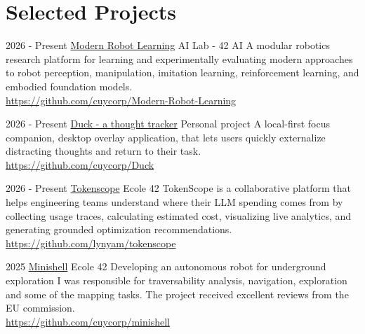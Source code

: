 \documentclass[]{friggeri-cv}
\begin{document}

\section{Selected Projects}

\begin{entrylist}

  \entry
    {2026 - Present}
    {\href{https://github.com/cuycorp/Modern-Robot-Learning}{Modern Robot Learning}}
    {AI Lab - 42 AI}
    {A modular robotics research platform for learning and experimentally evaluating modern approaches to robot perception, manipulation, imitation learning, reinforcement learning, and embodied foundation models.\\
    \url{https://github.com/cuycorp/Modern-Robot-Learning}}

  \entry
    {2026 - Present}
    {\href{https://github.com/cuycorp/Duck}{Duck - a thought tracker}}
    {Personal project}
    {A local-first focus companion, desktop overlay application, that lets users quickly externalize distracting thoughts and return to their task.\\
    \url{https://github.com/cuycorp/Duck}}

  \entry
    {2026 - Present}
    {\href{https://github.com/lynyam/tokenscope}{Tokenscope}}
    {Ecole 42}
    {TokenScope is a collaborative platform that helps engineering teams understand where their LLM spending comes from by collecting usage traces, calculating estimated cost, visualizing live analytics, and generating grounded optimization recommendations.\\
    \url{https://github.com/lynyam/tokenscope}}

  \entry
    {2025}
    {\href{https://github.com/cuycorp/minishell}{Minishell}}
    {Ecole 42}
    {Developing an autonomous robot for underground exploration I was responsible for traversability analysis, navigation, exploration and some of the mapping tasks. The project received excellent reviews from the EU commission.\\
    \url{https://github.com/cuycorp/minishell}}

\end{entrylist}


\end{document}
